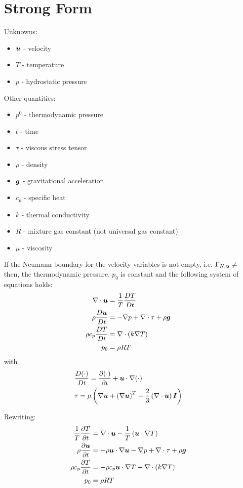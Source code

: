 \section{Strong Form}

\cite{CodinaPaper,CavityBenchmark}

Unknowns:
\begin{itemize}
\item $\boldsymbol{u}$ - velocity
\item $T$ - temperature
\item $p$ - hydrostatic pressure
\end{itemize}

Other quantities:
\begin{itemize}
\item $p^0$ - thermodynamic pressure
\item $t$ - time
\item $\tau$ - viscous stress tensor
\item $\rho$ - density
\item $\boldsymbol{g}$ - gravitational acceleration
\item $c_p$ - specific heat
\item $k$ - thermal conductivity
\item $R$ - mixture gas constant (not universal gas constant)
\item $\mu$ - viscosity
\end{itemize}

If the Neumann boundary for the velocity variables is not empty, i.e.
$\Gamma_{N,\bu} \ne \empty{}$then, the thermodynamic pressure, $p_0$
is constant and the following system of equations holds:
%
\begin{align}
\nabla \cdot \boldsymbol{u} &= \frac{1}{T}\frac{DT}{Dt}  \\
\rho \frac{D\boldsymbol{u}}{Dt} &= -\nabla p + \nabla \cdot \mathbf{\tau} + \rho \boldsymbol{g} \\
\rho c_p \frac{DT}{Dt} &= \nabla \cdot \left(k \nabla T \right) \\
p_0 &= \rho R T
\end{align}
%
with
%
\begin{align}
  &\frac{D(\cdot)}{Dt} = \frac{\partial (\cdot)}{\partial t} + \boldsymbol{u}
  \cdot \nabla (\cdot) \\
  &\tau = \mu \left( \nabla \boldsymbol{u} + \left(\nabla \boldsymbol{u}\right)^T -
  \frac{2}{3}\left( \nabla \cdot \boldsymbol{u} \right)\boldsymbol{I} \right)
\end{align}

Rewriting:
%
\begin{align}
\frac{1}{T} \frac{\partial T}{\partial t} &= \nabla
\cdot \boldsymbol{u} -  \frac{1}{T} \left( \boldsymbol{u} \cdot \nabla T  \right)  \\
\rho \frac{\partial \boldsymbol{u}}{\partial t} &= -\rho \boldsymbol{u} \cdot \nabla \boldsymbol{u} - \nabla
p + \nabla \cdot \tau + \rho \boldsymbol{g} \\
\rho c_p \frac{\partial T}{\partial t} &= -\rho c_p \boldsymbol{u} \cdot \nabla T + \nabla \cdot \left(k \nabla T \right) \\
p_0 &= \rho R T
\end{align}

